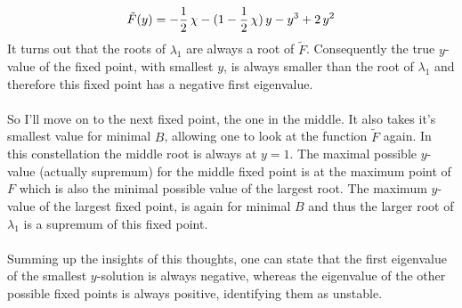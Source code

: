 \documentclass{article}
\begin{document}
\begin{align*}
    \tilde{F}({y})=-\frac{1}{2}\,\chi-(1-\frac{1}{2}\,\chi)\,{y}    - {y}^3+2\,{y}^2
\end{align*}
It turns out that the roots of $\lambda_1$ are always a root of $\tilde{F}$. Consequently the true $y$-value of the fixed point, with smallest $y$, is always smaller than the root of $\lambda_1$ and therefore this fixed point has a negative first eigenvalue.\\\\
So I'll move on to the next fixed point, the one in the middle. It also takes it's smallest value for minimal $B$, allowing one to look at the function $\tilde{F}$ again. In this constellation the middle root is always at ${y}=1$. The maximal possible $y$-value (actually supremum) for the middle fixed point is at the maximum point of $F$ which is also the minimal possible value of the largest root. The maximum $y$-value of the largest fixed point, is again for minimal $B$ and thus the larger root of $\lambda_1$ is a supremum of this fixed point. \\\\
Summing up the insights of this thoughts, one can state that the first eigenvalue of the smallest $y$-solution is always negative, whereas the eigenvalue of the other possible fixed points is always positive, identifying them as unstable.
\end{document}
